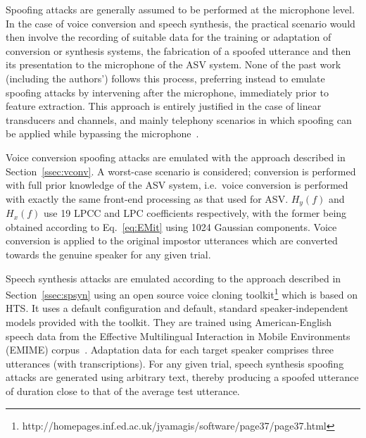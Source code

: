 
Spoofing attacks are generally assumed to be performed at the microphone level.
In the case of voice conversion and speech synthesis, the practical scenario would then involve the recording of suitable data for the training or adaptation of conversion or synthesis systems, the fabrication of a spoofed utterance and then its presentation to the microphone of the ASV system.
None of the past work (including the authors') follows this process, preferring instead to emulate spoofing attacks by intervening after the microphone, immediately prior to feature extraction.
This approach is entirely justified in the case of linear transducers and channels, and mainly telephony scenarios in which spoofing can be applied while bypassing the microphone~\cite{handbookChapter}.

Voice conversion spoofing attacks are emulated with the approach described in Section~\ref{ssec:vconv}. 
A worst-case scenario is considered; conversion is performed with full prior knowledge of the ASV system, i.e.\ voice conversion is performed with exactly the same front-end processing as that used for ASV.
$H_y(f)$ and $H_x(f)$ use 19 LPCC and LPC coefficients respectively, with the former being obtained according to Eq.~\ref{eq:EMit} using 1024 Gaussian components.
Voice conversion is applied to the original impostor utterances which are converted towards the genuine speaker for any given trial.

Speech synthesis attacks are emulated according to the approach described in Section~\ref{ssec:spsyn} using an open source voice cloning toolkit\footnote{http://homepages.inf.ed.ac.uk/jyamagis/software/page37/page37.html} which is based on HTS.  It uses  a default configuration and default, standard speaker-independent models provided with the toolkit.  They are trained using American-English speech data from the Effective Multilingual Interaction in Mobile Environments (EMIME) corpus~\cite{Wester2010}.   
Adaptation data for each target speaker comprises three utterances (with transcriptions).  
For any given trial, speech synthesis spoofing attacks are generated using arbitrary text, thereby producing a spoofed utterance of duration close to that of the average test utterance.
